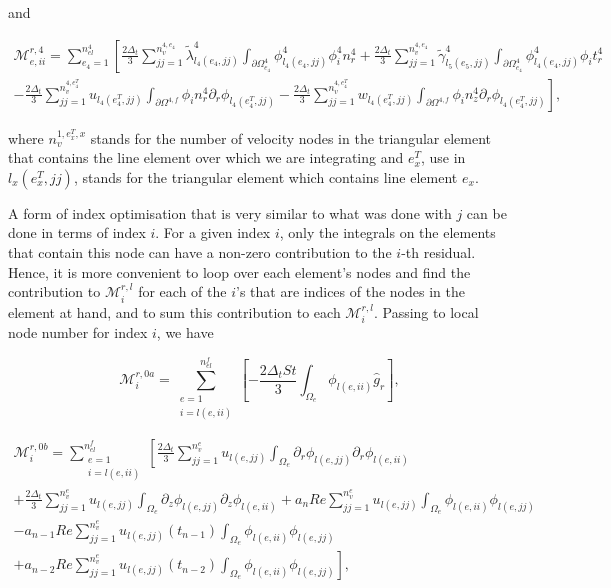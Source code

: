 \documentclass{article}
\begin{document}
and

\begin{equation}
\begin{array}{l} \mathcal{M}_{e,ii}^{r,4} = \sum_{e_4=1}^{n_{el}^{4}} \left[ \frac{2\Delta_t}{3} \sum_{jj=1}^{n_v^{4,e_4}} \tilde{\lambda}_{l_4(e_4,jj)}^4 \int_{\partial \Omega_{e_4}^{4}} \phi_{l_4(e_4,jj)}^4 \phi_i^4 n_r^4 + \frac{2\Delta_t}{3} \sum_{jj=1}^{n_v^{4,e_4}} \tilde{\gamma}_{l_5(e_5,jj)}^4 \int_{\partial \Omega_{e_4}^{4}} \phi_{l_4(e_4,jj)}^4 \phi_i t_r^4 \right. \\ \left. - \frac{2\Delta_t}{3} \sum_{jj=1}^{n_v^{4,e_4^T}} u_{l_4(e_4^T,jj)} \int_{\partial \Omega^{4,f}} \phi_i n_r^4 \partial_r \phi_{l_4(e_4^T,jj)} - \frac{2\Delta_t}{3} \sum_{jj=1}^{n_v^{4,e_4^T}} w_{l_4(e_4^T,jj)} \int_{\partial \Omega^{4,f}} \phi_i n_z^4 \partial_r \phi_{l_4(e_4^T,jj)} \right], \end{array} \tag{4.121}
\end{equation}

where \(n_v^{1,e_x^T,x}\) stands for the number of velocity nodes in the triangular element that contains the line element over which we are integrating and \(e_x^T\), use in \(l_x(e_x^T,jj)\), stands for the triangular element which contains line element \(e_x\).

A form of index optimisation that is very similar to what was done with \(j\) can be done in terms of index \(i\). For a given index \(i\), only the integrals on the elements that contain this node can have a non-zero contribution to the \(i\)-th residual. Hence, it is more convenient to loop over each element's nodes and find the contribution to \(\mathcal{M}_i^{r,l}\) for each of the \(i\)'s that are indices of the nodes in the element at hand, and to sum this contribution to each \(\mathcal{M}_i^{r,l}\). Passing to local node number for index \(i\), we have

\begin{equation}
\mathcal{M}_i^{r,0a} = \sum_{\substack{e=1 \\ i=l(e,ii)}}^{n_{el}^f} \left[ -\frac{2\Delta_t St}{3} \int_{\Omega_e} \phi_{l(e,ii)} \hat{g}_r \right], \tag{4.122}
\end{equation}

\begin{equation}
\begin{array}{l} \mathcal{M}_i^{r,0b} = \sum_{\substack{e=1 \\ i=l(e,ii)}}^{n_{el}^f} \left[ \frac{2\Delta_t}{3} \sum_{jj=1}^{n_v^e} u_{l(e,jj)} \int_{\Omega_e} \partial_r \phi_{l(e,jj)} \partial_r \phi_{l(e,ii)} \right. \\ + \frac{2\Delta_t}{3} \sum_{jj=1}^{n_v^e} u_{l(e,jj)} \int_{\Omega_e} \partial_z \phi_{l(e,jj)} \partial_z \phi_{l(e,ii)} + a_n Re \sum_{jj=1}^{n_v^e} u_{l(e,jj)} \int_{\Omega_e} \phi_{l(e,ii)} \phi_{l(e,jj)} \\ - a_{n-1} Re \sum_{jj=1}^{n_v^e} u_{l(e,jj)}(t_{n-1}) \int_{\Omega_e} \phi_{l(e,ii)} \phi_{l(e,jj)} \\ \left. + a_{n-2} Re \sum_{jj=1}^{n_v^e} u_{l(e,jj)}(t_{n-2}) \int_{\Omega_e} \phi_{l(e,ii)} \phi_{l(e,jj)} \right], \end{array} \tag{4.123}
\end{equation}
\end{document}
